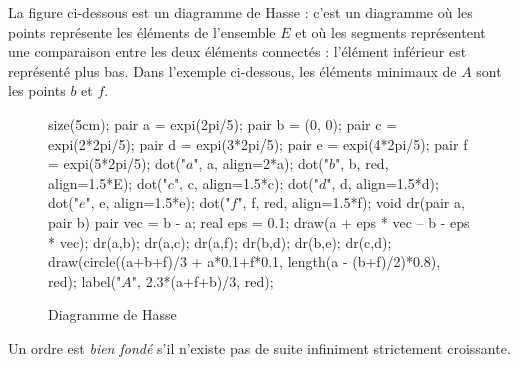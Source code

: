\begin{exm}
	La figure ci-dessous est un diagramme de {\sc Hasse}\/ : c'est un diagramme où les points représente les éléments de l'ensemble $E$\/ et où les segments représentent une comparaison entre les deux éléments connectés : l'élément inférieur est représenté plus bas. Dans l'exemple ci-dessous, les éléments minimaux de $A$\/ sont les points $b$\/ et $f$.

	\begin{figure}[H]
		\centering
		\begin{asy}
			size(5cm);
			pair a = expi(2pi/5);
			pair b = (0, 0);
			pair c = expi(2*2pi/5);
			pair d = expi(3*2pi/5);
			pair e = expi(4*2pi/5);
			pair f = expi(5*2pi/5);
			dot("$a$", a, align=2*a);
			dot("$b$", b, red, align=1.5*E);
			dot("$c$", c, align=1.5*c);
			dot("$d$", d, align=1.5*d);
			dot("$e$", e, align=1.5*e);
			dot("$f$", f, red, align=1.5*f);
			void dr(pair a, pair b) {
				pair vec = b - a;
				real eps = 0.1;
				draw(a + eps * vec -- b - eps * vec);
			}
			dr(a,b);
			dr(a,c);
			dr(a,f);
			dr(b,d);
			dr(b,e);
			dr(c,d);
			draw(circle((a+b+f)/3 + a*0.1+f*0.1, length(a - (b+f)/2)*0.8), red);
			label("\large$A$", 2.3*(a+f+b)/3, red);
		\end{asy}
		\caption{Diagramme de {\sc Hasse}}
	\end{figure}
\end{exm}

\begin{defn}
	Un ordre est {\it bien fondé\/} s'il n'existe pas de suite infiniment strictement croissante.
\end{defn}


